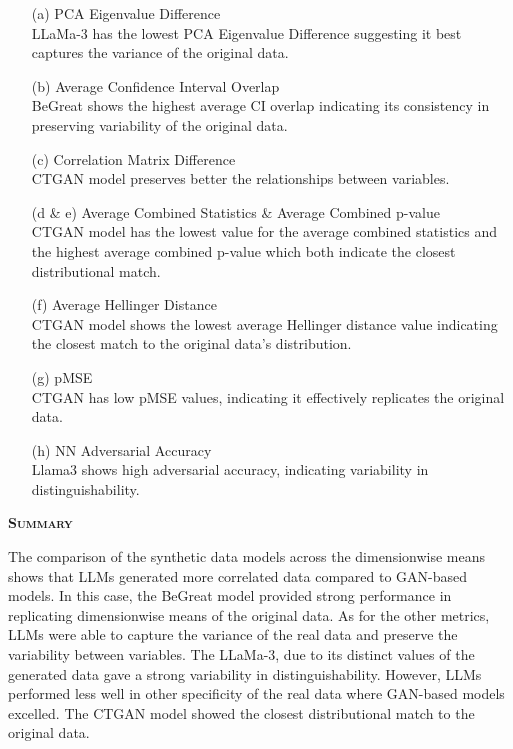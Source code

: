 \begin{enumerate}
    \item[(a)] PCA Eigenvalue Difference \\
    LLaMa-3 has the lowest PCA Eigenvalue Difference suggesting it best captures the variance of the original data. 

    \item[(b)] Average Confidence Interval Overlap \\
    BeGreat shows the highest average CI overlap indicating its consistency in preserving variability of the original data.

    \item[(c)] Correlation Matrix Difference \\
    CTGAN model preserves better the relationships between variables.

    \item[(d \& e)] Average Combined Statistics \& Average Combined p-value \\
    CTGAN model has the lowest value for the average combined statistics and the highest average combined p-value which both indicate the closest distributional match.

    \item[(f)] Average Hellinger Distance \\
    CTGAN model shows the lowest average Hellinger distance value indicating the closest match to the original data’s distribution.

    \item[(g)] pMSE \\
    CTGAN has low pMSE values, indicating it effectively replicates the original data. 

    \item[(h)] NN Adversarial Accuracy \\
    Llama3 shows high adversarial accuracy, indicating variability in distinguishability.
\end{enumerate}

\vspace{1cm}

\noindent \textsc{ \textbf{Summary}}

The comparison of the synthetic data models across the dimensionwise means shows that LLMs generated more correlated data compared to GAN-based models. In this case, the BeGreat model provided strong performance in replicating dimensionwise means of the original data. As for the other metrics, LLMs were able to capture the variance of the real data and preserve the variability between variables. The LLaMa-3, due to its distinct values of the generated data gave a strong variability in distinguishability. However, LLMs performed less well in other specificity of the real data where GAN-based models excelled. The CTGAN model showed the closest distributional match to the original data.


